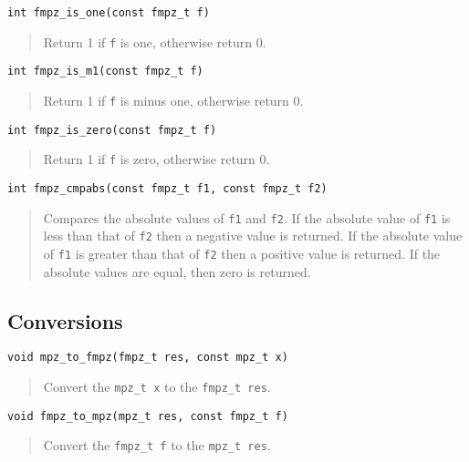 \documentclass[a4paper,10pt]{article}
\newcommand{\code}{\lstinline}
\begin{document}
\begin{lstlisting}
int fmpz_is_one(const fmpz_t f)
\end{lstlisting}
\begin{quote}
Return 1 if \code{f} is one, otherwise return 0.
\end{quote}

\begin{lstlisting}
int fmpz_is_m1(const fmpz_t f)
\end{lstlisting}
\begin{quote}
Return 1 if \code{f} is minus one, otherwise return 0.
\end{quote}

\begin{lstlisting}
int fmpz_is_zero(const fmpz_t f)
\end{lstlisting}
\begin{quote}
Return 1 if \code{f} is zero, otherwise return 0.
\end{quote}

\begin{lstlisting}
int fmpz_cmpabs(const fmpz_t f1, const fmpz_t f2)
\end{lstlisting}
\begin{quote}
Compares the absolute values of \code{f1} and \code{f2}. If the absolute value of \code{f1} is less than that of \code{f2} then a negative value is returned. If the absolute value of \code{f1} is greater than that of \code{f2} then a positive value is returned. If the absolute values are equal, then zero is returned. 
\end{quote}

\subsection{Conversions}

\begin{lstlisting}
void mpz_to_fmpz(fmpz_t res, const mpz_t x)
\end{lstlisting}
\begin{quote}
Convert the \code{mpz_t x} to the \code{fmpz_t res}. 
\end{quote}

\begin{lstlisting}
void fmpz_to_mpz(mpz_t res, const fmpz_t f)
\end{lstlisting}
\begin{quote}
Convert the \code{fmpz_t f} to the \code{mpz_t res}. 
\end{quote}
\end{document}
